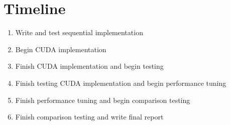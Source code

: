 \documentclass{article}
\begin{document}
\section*{Timeline}
\begin{enumerate}[leftmargin=*, label=\textbf{Week \arabic*:}]
    \item
        Write and test sequential implementation
    \item
        Begin CUDA implementation
    \item
        Finish CUDA implementation and begin testing
    \item
        Finish testing CUDA implementation and begin performance tuning
    \item
        Finish performance tuning and begin comparison testing
    \item
        Finish comparison testing and write final report
\end{enumerate}
\end{document}
